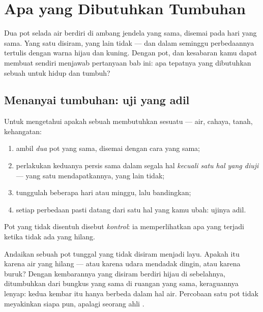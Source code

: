 \chapter{Apa yang Dibutuhkan Tumbuhan}\label{ch:g4:what-plants-need}

Dua pot selada air berdiri di ambang jendela yang sama, disemai pada
hari yang sama. Yang satu disiram, yang lain tidak --- dan dalam
seminggu perbedaannya tertulis dengan warna hijau dan kuning. Dengan
pot,  dan kesabaran kamu dapat membuat  sendiri
menjawab pertanyaan bab ini: apa tepatnya yang dibutuhkan sebuah
 untuk hidup dan tumbuh?

\section{Menanyai tumbuhan: uji yang adil}

\begin{method}\label{met:g4:what-plants-need:fairtest}
Untuk mengetahui apakah sebuah  membutuhkan sesuatu --- air,
cahaya, tanah, kehangatan:
\begin{enumerate}
  \item ambil \emph{dua} pot  yang sama, disemai dengan cara
        yang sama;
  \item perlakukan keduanya persis sama dalam segala hal \emph{kecuali
        satu hal yang diuji} --- yang satu mendapatkannya, yang lain
        tidak;
  \item tunggulah beberapa hari atau minggu, lalu bandingkan;
  \item setiap perbedaan pasti datang dari satu hal yang kamu ubah:
        ujinya adil.
\end{enumerate}
Pot yang tidak disentuh disebut \emph{kontrol}: ia memperlihatkan apa yang terjadi ketika tidak ada yang
hilang.
\end{method}

\begin{example}\label{ex:g4:what-plants-need:control}
Andaikan sebuah pot tunggal yang tidak disiram menjadi layu. Apakah
itu karena air yang hilang --- atau karena udara mendadak dingin, atau
karena  buruk? Dengan kembarannya yang disiram berdiri hijau di
sebelahnya, ditumbuhkan dari bungkus yang sama di ruangan yang sama,
keraguannya lenyap: kedua kembar itu hanya berbeda dalam hal air.
Percobaan satu pot tidak meyakinkan siapa pun, apalagi seorang ahli
.
\end{example}


